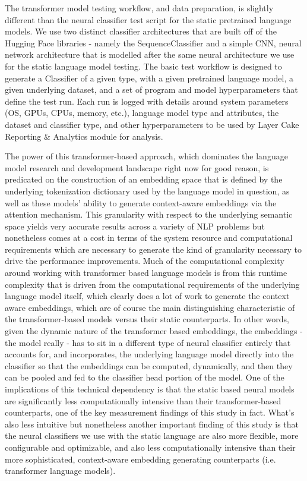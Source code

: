 \documentclass[final]{clv2025-revised}
\begin{document}
The transformer model testing workflow, and data preparation, is slightly different than the neural classifier test script for the static pretrained language models. We use two distinct classifier architectures that are built off of the Hugging Face libraries - namely the SequenceClassifier and a simple CNN, neural network architecture that is modelled after the same neural architecture we use for the static language model testing. The basic test workflow is designed to generate a Classifier of a given type, with a given pretrained language model, a given underlying dataset, and a set of program and model hyperparameters that define the test run. Each run is logged with details around system parameters (OS, GPUs, CPUs, memory, etc.), language model type and attributes, the dataset and classifier type, and other hyperparameters to be used by Layer Cake Reporting \& Analytics module for analysis.

The power of this transformer-based approach, which dominates the language model research and development landscape right now for good reason, is predicated on the construction of an embedding space that is defined by the underlying tokenization dictionary used by the language model in question, as well as these models' ability to generate context-aware embeddings via the attention mechanism. This granularity with respect to the underlying semantic space yields very accurate results across a variety of NLP problems but nonetheless comes at a cost in terms of the system resource and computational requirements which are necessary to generate the kind of granularity necessary to drive the performance improvements. Much of the computational complexity around working with transformer based language models is from this runtime complexity that is driven from the computational requirements of the underlying language model itself, which clearly does a lot of work to generate the context aware embeddings, which are of course the main distinguishing characteristic of the transformer-based models versus their static counterparts. In other words, given the dynamic nature of the transformer based embeddings, the embeddings - the model really - has to sit in a different type of neural classifier entirely that accounts for, and incorporates, the underlying language model directly into the classifier so that the embeddings can be computed, dynamically, and then they can be pooled and fed to the classifier head portion of the model. One of the implications of this technical dependency is that the static based neural models are significantly less computationally intensive than their transformer-based counterparts, one of the key measurement findings of this study in fact. What's also less intuitive but nonetheless another important finding of this study is that the neural classifiers we use with the static language are also more flexible, more configurable and optimizable, and also less computationally intensive than their more sophisticated, context-aware embedding generating counterparts (i.e. transformer language models). 
\end{document}
